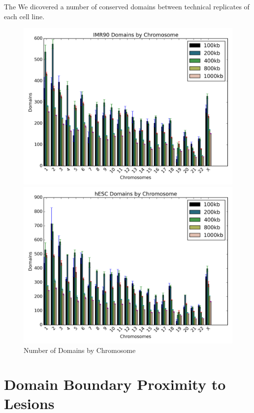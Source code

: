 The We dicovered a number of conserved domains between technical replicates of each cell line.  

\begin{figure}[thp]
  \caption{Number of Domains by Chromosome}
  \begin{minipage}{0.5\textwidth}%
    \centering
    \includegraphics[width=\textwidth]{./figures/results/domain_imr90_bar.png}
  \end{minipage}

  \begin{minipage}{0.5\textwidth}
    \centering
    \includegraphics[width=\textwidth]{./figures/results/domain_hesc_bar.png}
  \end{minipage}
\end{figure}

\section*{Domain Boundary Proximity to Lesions}


